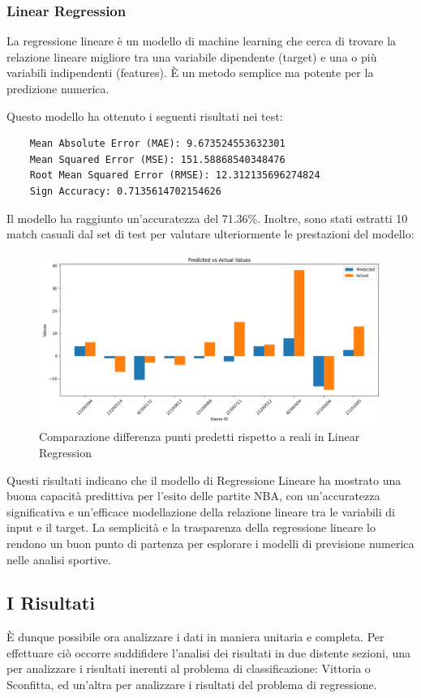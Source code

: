 \subsubsection{Linear Regression}

La regressione lineare è un modello di machine learning che cerca di trovare la relazione lineare migliore tra una variabile dipendente (target) e una o più variabili indipendenti (features). È un metodo semplice ma potente per la predizione numerica.

Questo modello ha ottenuto i seguenti risultati nei test:

\begin{lstlisting}
    Mean Absolute Error (MAE): 9.673524553632301
    Mean Squared Error (MSE): 151.58868540348476
    Root Mean Squared Error (RMSE): 12.312135696274824
    Sign Accuracy: 0.7135614702154626
\end{lstlisting}

Il modello ha raggiunto un'accuratezza del 71.36\%. Inoltre, sono stati estratti 10 match casuali dal set di test per valutare ulteriormente le prestazioni del modello:

\begin{figure}[H]
    \centering
    \includegraphics[width=0.7\linewidth]{img/linear_regression_istogramma.png}
    \caption{Comparazione differenza punti predetti rispetto a reali in Linear Regression}
    \label{fig:enter-label}
\end{figure}

Questi risultati indicano che il modello di Regressione Lineare ha mostrato una buona capacità predittiva per l'esito delle partite NBA, con un'accuratezza significativa e un'efficace modellazione della relazione lineare tra le variabili di input e il target. La semplicità e la trasparenza della regressione lineare lo rendono un buon punto di partenza per esplorare i modelli di previsione numerica nelle analisi sportive.


\subsection{I Risultati}
È dunque possibile ora analizzare i dati in maniera unitaria e completa. Per effettuare ciò occorre suddifidere l'analisi dei risultati in due distente sezioni, una per analizzare i risultati inerenti al problema di classificazione: Vittoria o Sconfitta, ed un'altra per analizzare i risultati del problema di regressione.

